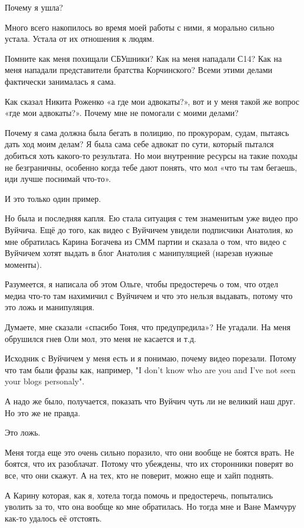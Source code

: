 Почему я ушла? 

Много всего накопилось во время моей работы с ними, я морально сильно устала.
Устала от их отношения к людям.

Помните как меня похищали СБУшники? Как на меня нападали С14? Как на меня
нападали представители братства Корчинского? Всеми этими делами фактически
занималась я сама.  

Как сказал Никита Роженко «а где мои адвокаты?», вот и у меня такой же вопрос
«где мои адвокаты?». Почему мне не помогали с моими делами? 

Почему я сама должна была бегать в полицию, по прокурорам, судам, пытаясь дать
ход моим делам? Я была сама себе адвокат по сути, который пытался добиться хоть
какого-то результата. Но мои внутренние ресурсы на такие походы не безграничны,
особенно когда тебе дают понять, что мол «что ты там бегаешь, иди лучше
поснимай что-то». 

И это только один пример.

Но была и последняя капля. Ею стала ситуация с тем знаменитым уже видео про
Вуйчича. Ещё до того, как видео с Вуйчичем увидели подписчики Анатолия, ко мне
обратилась Карина Богачева из СММ партии и сказала о том, что видео с Вуйчичем
хотят выдать в блог Анатолия с манипуляцией (нарезав нужные моменты).

Разумеется, я написала об этом Ольге, чтобы предостеречь о том, что отдел медиа
что-то там нахимичил с Вуйчичем и что это нельзя выдавать, потому что это ложь
и манипуляция. 

Думаете, мне сказали «спасибо Тоня, что предупредила»? Не угадали. На меня
обрушился гнев Оли мол, это меня не касается и т.д. 

Исходник с Вуйчичем у меня есть и я понимаю, почему видео порезали. Потому что
там были фразы как, например, "I don't know who are you and I've not seen your
blogs personaly". 

А надо же было, получается, показать что Вуйчич чуть ли не великий наш друг. Но
это же не правда. 

Это ложь. 

Меня тогда еще это очень сильно поразило, что они вообще не боятся врать. Не
боятся, что их разоблачат. Потому что убеждены, что их сторонники поверят во
все, что они скажут. А на тех, кто не поверит, можно еще и хайп поднять.

А Карину которая, как я, хотела тогда помочь и предостеречь, попытались уволить
за то, что она вообще ко мне обратилась. Но тогда мне и Ване Мамчуру как-то
удалось её отстоять. 


